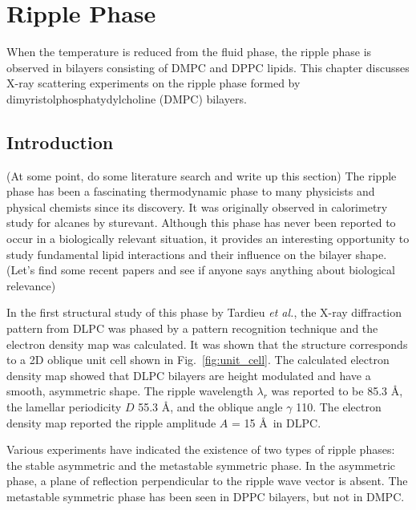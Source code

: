 \chapter{Ripple Phase}
When the temperature is reduced from the fluid phase, 
the ripple phase is observed in bilayers consisting of DMPC and DPPC lipids.
This chapter discusses X-ray scattering experiments on the ripple phase 
formed by dimyristolphosphatydylcholine (DMPC) bilayers. 

\section{Introduction}
(At some point, do some literature search and write up this section)
The ripple phase has been a fascinating thermodynamic phase to many physicists 
and physical chemists since its discovery. It was originally observed in 
calorimetry study for alcanes by sturevant. Although this phase has never been reported to 
occur in a biologically relevant situation, it provides an interesting opportunity
to study fundamental lipid interactions and their influence on the bilayer 
shape. (Let's find some recent papers and see if anyone says anything about
biological relevance)

In the first structural study of this phase by Tardieu \textit{et al.},
the X-ray diffraction pattern from DLPC was phased by a pattern recognition
technique and the electron density map was calculated. It was shown that the structure
corresponds to a 2D oblique unit cell shown in Fig.~\ref{fig:unit_cell}.
The calculated 
electron density map showed that DLPC bilayers are height modulated
and have a smooth, asymmetric shape. 
The ripple wavelength $\lambda_r$ was reported to be 85.3 \AA, 
the lamellar periodicity $D$ 55.3 \AA, and the oblique angle
$\gamma$ 110\textdegree. 
The electron density map reported the ripple amplitude $A$ = 15 \AA\ in DLPC.

Various experiments have indicated the existence of two types of ripple phases:
the stable asymmetric and the metastable symmetric phase. In the asymmetric
phase, a plane of reflection perpendicular to the ripple wave vector is 
absent. The metastable symmetric phase has been seen in DPPC bilayers, but not
in DMPC.

